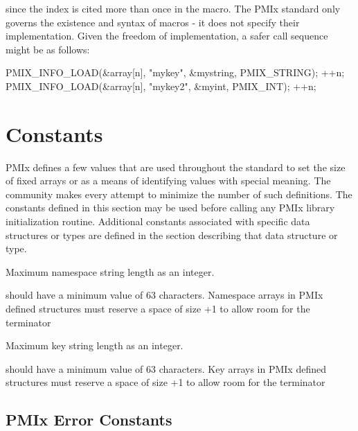 since the index is cited more than once in the macro. The \ac{PMIx} standard only governs the existence and syntax of macros - it does not specify their implementation. Given the freedom of implementation, a safer call sequence might be as follows:

\begin{codepar}
PMIX_INFO_LOAD(&array[n], "mykey", &mystring, PMIX_STRING);
++n;
PMIX_INFO_LOAD(&array[n], "mykey2", &myint, PMIX_INT);
++n;
\end{codepar}

\adviceuserend

\section{Constants}

\ac{PMIx} defines a few values that are used throughout the standard to set the size of fixed arrays or as a means of identifying values with special meaning.
The community makes every attempt to minimize the number of such definitions.
The constants defined in this section may be used before calling any \ac{PMIx} library initialization routine.
Additional constants associated with specific data structures or types are defined in the section describing that data structure or type.

\begin{constantdesc}
%
Maximum namespace string length as an integer.
\end{constantdesc}

\adviceimplstart
{} should have a minimum value of 63 characters. Namespace arrays in \ac{PMIx} defined structures must reserve
a space of size +1 to allow room for the  terminator
\adviceimplend

\begin{constantdesc}
%
Maximum key string length as an integer.
%
\end{constantdesc}

\adviceimplstart
{} should have a minimum value of 63 characters. Key arrays in \ac{PMIx} defined structures must reserve
a space of size +1 to allow room for the  terminator
\adviceimplend


\subsection{PMIx Error Constants}
\label{api:struct:errors}

